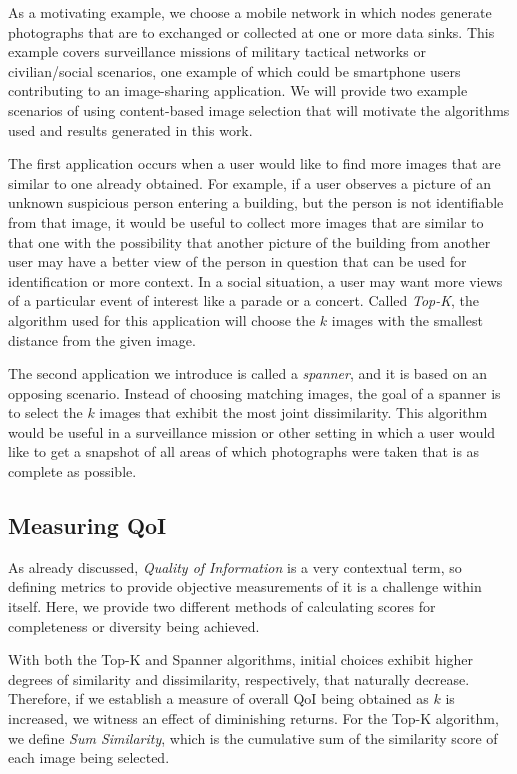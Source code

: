 As a motivating example, we choose a mobile network in which nodes generate photographs that are to exchanged or collected at one or more data sinks.  This example covers surveillance missions of military tactical networks or civilian/social scenarios, one example of which could be smartphone users contributing to an image-sharing application.  We will provide two example scenarios of using content-based image selection that will motivate the algorithms used and results generated in this work.

The first application occurs when a user would like to find more images that are similar to one already obtained.  For example, if a user observes a picture of an unknown suspicious person entering a building, but the person is not identifiable from that image, it would be useful to collect more images that are similar to that one with the possibility that another picture of the building from another user may have a better view of the person in question that can be used for identification or more context.  In a social situation, a user may want more views of a particular event of interest like a parade or a concert.  Called \emph{Top-K}, the algorithm used for this application will choose the $k$ images with the smallest distance from the given image. 

The second application we introduce is called a \emph{spanner}, and it is based on an opposing scenario.  Instead of  choosing matching images, the goal of a spanner is to select the $k$ images that exhibit the most joint dissimilarity.  This algorithm would be useful in a surveillance mission or other setting in which a user would like to get a snapshot of all areas of which photographs were taken that is as complete as possible.  

\subsection{Measuring QoI}

As already discussed, \emph{Quality of Information} is a very contextual term, so defining metrics to provide objective measurements of it is a challenge within itself.  Here, we provide two different methods of calculating scores for completeness or diversity being achieved.  

With both the Top-K and Spanner algorithms, initial choices exhibit higher degrees of similarity and dissimilarity, respectively, that naturally decrease.  Therefore, if we establish a measure of overall QoI being obtained as $k$ is increased, we witness an effect of diminishing returns.  For the Top-K algorithm, we define \emph{Sum Similarity}, which is the cumulative sum of the similarity score of each image being selected.  

